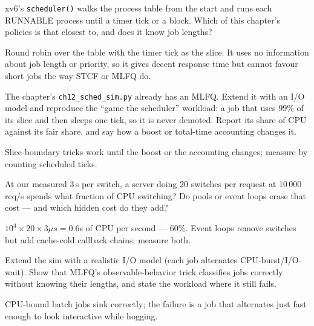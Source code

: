 \begin{exercise}[medium]
xv6's \texttt{scheduler()} walks the process table from the start
and runs each RUNNABLE process until a timer tick or a block. Which
of this chapter's policies is that closest to, and does it know job
lengths?
\end{exercise}
\begin{solution}[hint]
Round robin over the table with the timer tick as the slice. It uses
no information about job length or priority, so it gives decent
response time but cannot favour short jobs the way STCF or MLFQ do.
\end{solution}

\begin{exercise}[hard]
The chapter's \texttt{ch12\_sched\_sim.py} already has an MLFQ. Extend
it with an I/O model and reproduce the ``game the scheduler''
workload: a job that uses $99\%$ of its slice and then sleeps one
tick, so it is never demoted. Report its share of CPU against its
fair share, and say how a boost or total-time accounting changes it.
\end{exercise}
\begin{solution}[hint]
Slice-boundary tricks work until the boost or the accounting
changes; measure by counting scheduled ticks.
\end{solution}

\begin{exercise}[hard]
At our measured 3\,\textmu s per switch, a server doing 20
switches per request at 10\,000 req/s spends what fraction of CPU
switching? Do pools or event loops erase that cost --- and which
hidden cost do they add?
\end{exercise}
\begin{solution}[hint]
$10^4\times20\times3\mu s = 0.6$s of CPU per second ---
60\%. Event loops remove switches but add
cache-cold callback chains; measure both.
\end{solution}

\begin{exercise}[hard]
Extend the sim with a realistic I/O model (each job alternates
CPU-burst/I/O-wait). Show that MLFQ's observable-behavior trick
classifies jobs correctly without knowing their lengths, and state
the workload where it still fails.
\end{exercise}
\begin{solution}[hint]
CPU-bound batch jobs sink correctly; the failure is a job that
alternates just fast enough to look interactive while hogging.
\end{solution}

